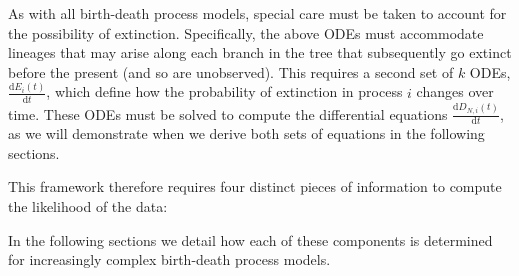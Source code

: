 As with all birth-death process models, special care must be taken to account for the possibility of extinction.
Specifically, the above ODEs must accommodate lineages that may arise along each branch in the tree that subsequently go extinct before the present (and so are unobserved).
This requires a second set of $k$ ODEs, $\frac{ \mathrm{d}E_{i}(t)}{\mathrm{d}t}$, which define how the probability of extinction in process $i$ changes over time.
These ODEs must be solved to compute the differential equations $\frac{ \mathrm{d}D_{N,i}(t)}{\mathrm{d}t}$, as we will demonstrate when we derive both sets of equations in the following sections.

This framework therefore requires four distinct pieces of information to compute the likelihood of the data:

In the following sections we detail how each of these components is determined for increasingly complex birth-death process models.


